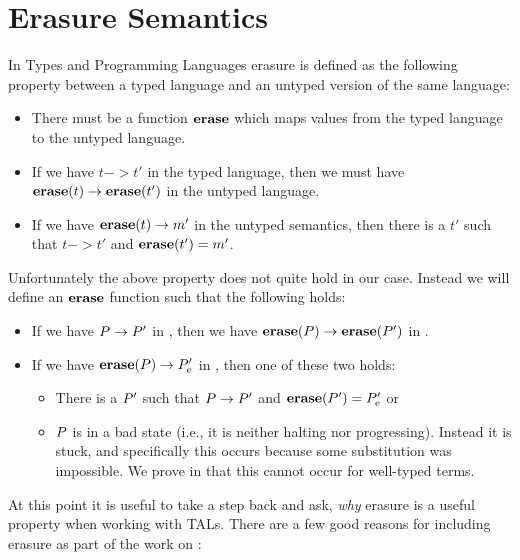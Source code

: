 \chapter{Erasure Semantics}
\label{chap:erasure}

In Types and Programming Languages\cite{typesandprog} erasure is defined as the following
property between a typed language and an untyped version of the same language:

\begin{itemize}
\item There must be a function ${\mathbf{erase}}$ which maps values from the typed
  language to the untyped language.
\item If we have $t -> t'$ in the typed language, then we must have
  ${\mathbf{erase}}(t) -> {\mathbf{erase}}(t')$ in the untyped language.
\item If we have ${\mathbf{erase}}(t) -> m'$ in the untyped semantics, then there is a $t'$
  such that $t -> t'$ and ${\mathbf{erase}}(t') = m'$.
\end{itemize}

Unfortunately the above property does not quite hold in our case. Instead we
will define an ${\mathbf{erase}}$ function such that the following holds:

\begin{itemize}
\item If we have ${P} -> {P'}$ in \ATAL, then we have
  ${{\mathbf{erase}}(P)} -> {{\mathbf{erase}}(P')}$ in \ATALe.
\item If we have ${{\mathbf{erase}}(P)} -> {P'_{\mathrm{e}}}$ in \ATALe, then one of
  these two holds:
  \begin{itemize}
  \item There is a $P'$ such that ${P} -> {P'}$ and
    ${\mathbf{erase}}(P') = P'_{\mathrm{e}}$ or
  \item $P$ is in a bad state (i.e., it is neither halting nor
    progressing). Instead it is stuck, and specifically this occurs because some
    substitution was impossible. We prove in  that this cannot
    occur for well-typed terms.
  \end{itemize}
\end{itemize}

At this point it is useful to take a step back and ask, \emph{why} erasure is a
useful property when working with TALs. There are a few good reasons for
including erasure as part of the work on \ATAL:

